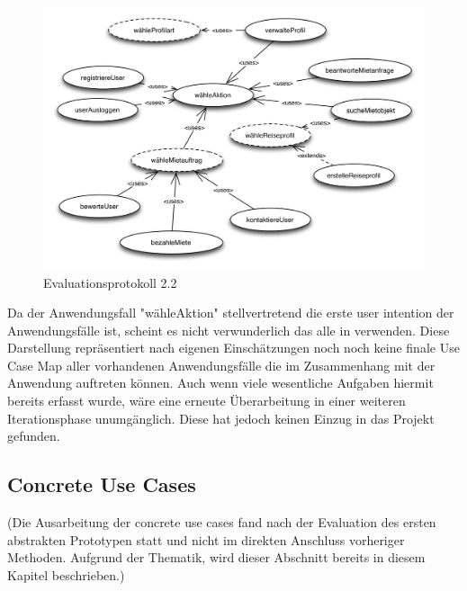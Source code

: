 \begin{figure}[H]
\includegraphics[width=1\textwidth]{./images/use.png}
\caption{Evaluationsprotokoll 2.2}
\label{fig:use}
\end{figure}

Da der Anwendungsfall "wähleAktion" stellvertretend die erste user intention der Anwendungsfälle ist, scheint es nicht verwunderlich das alle in verwenden. Diese Darstellung repräsentiert nach eigenen Einschätzungen noch noch keine finale Use Case Map aller vorhandenen Anwendungsfälle die im Zusammenhang mit der Anwendung auftreten können. Auch wenn viele wesentliche Aufgaben hiermit bereits erfasst wurde, wäre eine erneute Überarbeitung in einer weiteren Iterationsphase unumgänglich. Diese hat jedoch keinen Einzug in das Projekt gefunden.

\newpage
\subsection{Concrete Use Cases}
(Die Ausarbeitung der concrete use cases fand nach der Evaluation des ersten abstrakten Prototypen statt und nicht im direkten Anschluss vorheriger Methoden. Aufgrund der Thematik, wird dieser Abschnitt bereits in diesem Kapitel beschrieben.)\\

